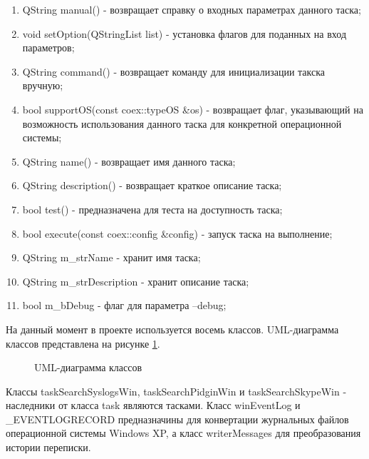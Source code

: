 \begin{enumerate}
\item QString manual() - возвращает справку о входных параметрах данного таска;
\item void setOption(QStringList list) - установка флагов для поданных на вход параметров;
\item QString command() - возвращает команду для инициализации такска вручную;
\item bool supportOS(const coex::typeOS \&os) - возвращает флаг, указывающий на возможность использования данного таска для конкретной операционной системы;
\item QString name() - возвращает имя данного таска;
\item QString description() - возвращает краткое описание таска;
\item bool test() - предназначена для теста на доступность таска;
\item bool execute(const coex::config \&config) - запуск таска на выполнение;
\item QString m\_strName - хранит имя таска;
\item QString m\_strDescription - хранит описание таска;
\item bool m\_bDebug - флаг для параметра --debug;
\end{enumerate}

На данный момент в проекте используется восемь классов. UML-диаграмма классов представлена на рисунке \ref{UML:UML}.

\begin{figure}[h!]
\caption{UML-диаграмма классов}
\label{UML:UML}
\end{figure}

Классы taskSearchSyslogsWin, taskSearchPidginWin и taskSearchSkypeWin - наследники от класса task являются тасками. Класс winEventLog и \_EVENTLOGRECORD предназначины для конвертации журнальных файлов операционной системы Windows XP, а класс writerMessages для преобразования истории переписки.
